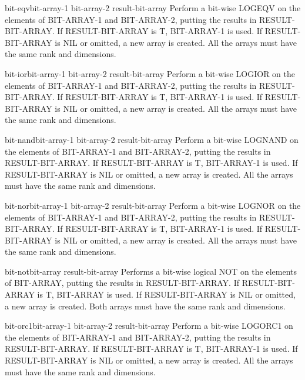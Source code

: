 \documentclass[10pt,english]{book}
\begin{document}
\begin{function}{bit-eqv}{bit-array-1 bit-array-2 \op result-bit-array}
  Perform a bit-wise LOGEQV on the elements of BIT-ARRAY-1 and BIT-ARRAY-2,
  putting the results in RESULT-BIT-ARRAY. If RESULT-BIT-ARRAY is T,
  BIT-ARRAY-1 is used. If RESULT-BIT-ARRAY is NIL or omitted, a new array is
  created. All the arrays must have the same rank and dimensions.
\end{function}

\begin{function}{bit-ior}{bit-array-1 bit-array-2 \op result-bit-array}
  Perform a bit-wise LOGIOR on the elements of BIT-ARRAY-1 and BIT-ARRAY-2,
  putting the results in RESULT-BIT-ARRAY. If RESULT-BIT-ARRAY is T,
  BIT-ARRAY-1 is used. If RESULT-BIT-ARRAY is NIL or omitted, a new array is
  created. All the arrays must have the same rank and dimensions.
\end{function}

\begin{function}{bit-nand}{bit-array-1 bit-array-2 \op result-bit-array}
  Perform a bit-wise LOGNAND on the elements of BIT-ARRAY-1 and BIT-ARRAY-2,
  putting the results in RESULT-BIT-ARRAY. If RESULT-BIT-ARRAY is T,
  BIT-ARRAY-1 is used. If RESULT-BIT-ARRAY is NIL or omitted, a new array is
  created. All the arrays must have the same rank and dimensions.
\end{function}

\begin{function}{bit-nor}{bit-array-1 bit-array-2 \op result-bit-array}
  Perform a bit-wise LOGNOR on the elements of BIT-ARRAY-1 and BIT-ARRAY-2,
  putting the results in RESULT-BIT-ARRAY. If RESULT-BIT-ARRAY is T,
  BIT-ARRAY-1 is used. If RESULT-BIT-ARRAY is NIL or omitted, a new array is
  created. All the arrays must have the same rank and dimensions.
\end{function}

\begin{function}{bit-not}{bit-array \op result-bit-array}
  Performs a bit-wise logical NOT on the elements of BIT-ARRAY,
  putting the results in RESULT-BIT-ARRAY. If RESULT-BIT-ARRAY is T,
  BIT-ARRAY is used. If RESULT-BIT-ARRAY is NIL or omitted, a new array is
  created. Both arrays must have the same rank and dimensions.
\end{function}

\begin{function}{bit-orc1}{bit-array-1 bit-array-2 \op result-bit-array}
  Perform a bit-wise LOGORC1 on the elements of BIT-ARRAY-1 and BIT-ARRAY-2,
  putting the results in RESULT-BIT-ARRAY. If RESULT-BIT-ARRAY is T,
  BIT-ARRAY-1 is used. If RESULT-BIT-ARRAY is NIL or omitted, a new array is
  created. All the arrays must have the same rank and dimensions.
\end{function}
\end{document}
